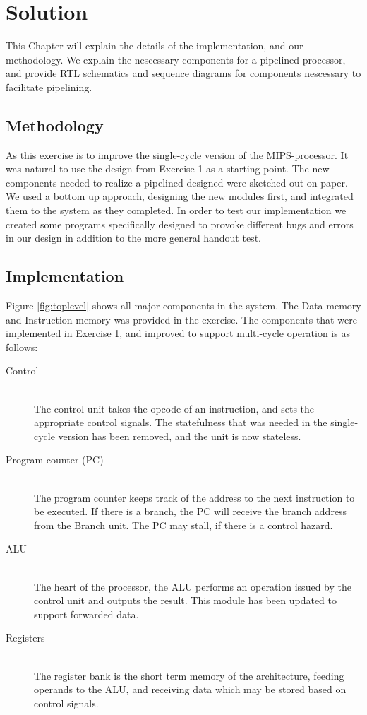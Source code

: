\chapter{Solution}
This Chapter will explain the details of the implementation, and our methodology. 
We explain the nescessary components for a pipelined processor, and provide RTL schematics and sequence diagrams for components nescessary to facilitate pipelining.


\section{Methodology}
As this exercise is to improve the single-cycle version of the MIPS-processor. It was natural to use the design from Exercise 1 \cite{ex1report} as a starting point.
The new components needed to realize a pipelined designed were sketched out on paper. We used a bottom up approach, designing the new modules first, and integrated them to the system as they completed.
In order to test our implementation we created some programs specifically designed to provoke different bugs and errors in our design in addition to the more general handout test.

\section{Implementation}
Figure \ref{fig:toplevel} shows all major components in the system. 
The Data memory and Instruction memory was provided in the exercise.
The components that were implemented in Exercise 1, and improved to support multi-cycle operation is as follows:

\begin{description}
  \item[Control] \hfill \\
  The control unit takes the opcode of an instruction, and sets the appropriate control signals. The statefulness that was needed in the single-cycle version has been removed, and the unit is now stateless.  
  \item[Program counter (PC)] \hfill \\
  The program counter keeps track of the address to the next instruction to be executed. If there is a branch, the PC will receive the branch address from the Branch unit. The PC may stall, if there is a control hazard.
  \item[ALU] \hfill \\
  The heart of the processor, the ALU performs an operation issued by the control unit and outputs the result. This module has been updated to support forwarded data.
  \item[Registers] \hfill \\
  The register bank is the short term memory of the architecture, feeding operands to the ALU, and receiving data which may be stored based on control signals.
\end{description}

